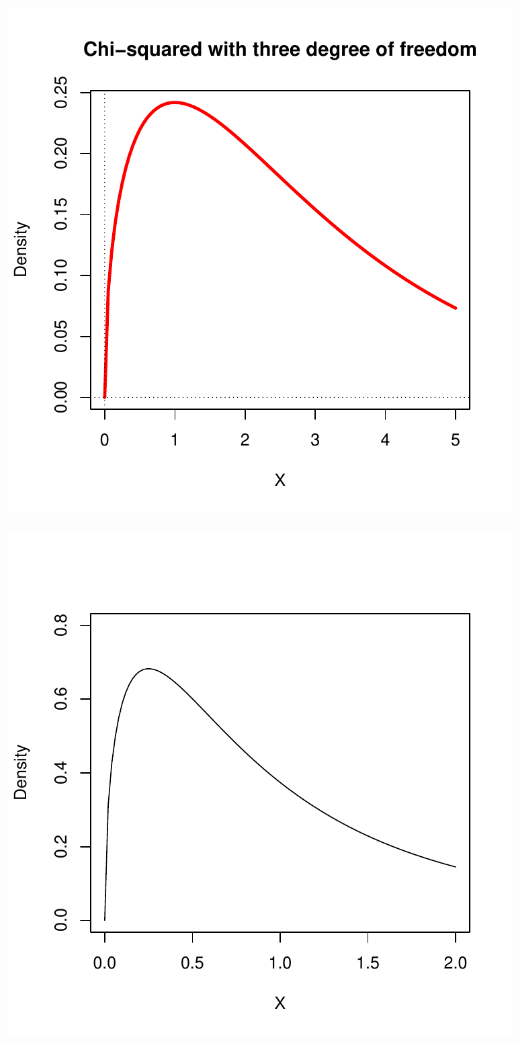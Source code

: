\documentclass[]{book}
\theoremstyle{definition}
\theoremstyle{definition}
\theoremstyle{definition}
\theoremstyle{remark}
\begin{document}
\begin{center}\includegraphics{bookdown-demo_files/figure-latex/unnamed-chunk-56-1} \end{center}

\begin{center}\includegraphics{bookdown-demo_files/figure-latex/unnamed-chunk-57-1} \end{center}
\end{document}

